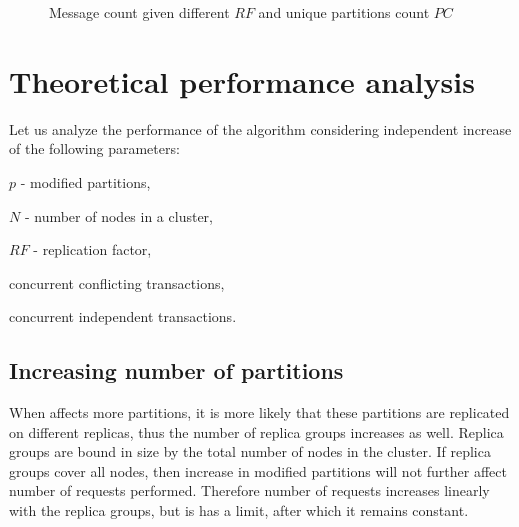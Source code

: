 \begin{figure}[hbt]
  \centering
  \setlength{\unitlength}{1.3cm}  
  \caption{Message count given different $RF$ and unique partitions count $PC$}
  \label{fig:tests:requestsCount}
\end{figure}

\section{Theoretical performance analysis}
Let us analyze the performance of the \mpt algorithm considering independent increase of the following parameters: 
\begin{enumerate*}[label=\alph*)]
\item $p$ - modified partitions,
\item $N$ - number of nodes in a cluster,
\item $RF$ - replication factor,
\item concurrent conflicting transactions,
\item concurrent independent transactions.
\end{enumerate*}

\subsection{Increasing number of partitions}
\label{sec:tests:perf:partitions}
When \mpt affects more partitions, it is more likely that these partitions are replicated on different replicas, thus the number of replica groups increases as well. Replica groups are bound in size by the total number of nodes in the cluster. If replica groups cover all nodes, then increase in modified partitions will not further affect number of requests performed. Therefore number of requests increases linearly with the replica groups, but is has a limit, after which it remains constant.

